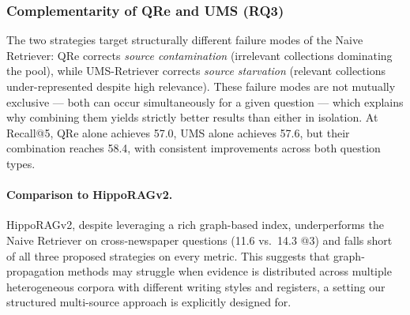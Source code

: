 \subsubsection{Complementarity of QRe and UMS (\textbf{RQ3})}
\label{sec:results-complementarity}

The two strategies target structurally different failure modes of the Naive Retriever:
QRe corrects \emph{source contamination} (irrelevant collections dominating the pool),
while UMS-Retriever corrects \emph{source starvation} (relevant collections
under-represented despite high relevance).
These failure modes are not mutually exclusive — both can occur simultaneously for
a given question — which explains why combining them yields strictly better results
than either in isolation.
At Recall@5, QRe alone achieves 57.0, UMS alone achieves 57.6, but their combination
reaches 58.4, with consistent improvements across both question types.

\paragraph{Comparison to HippoRAGv2.}
HippoRAGv2, despite leveraging a rich graph-based index, underperforms the Naive
Retriever on cross-newspaper questions (11.6 vs.\ 14.3 @3) and falls short
of all three proposed strategies on every metric.
This suggests that graph-propagation methods may struggle when evidence is distributed
across multiple heterogeneous corpora with different writing styles and registers,
a setting our structured multi-source approach is explicitly designed for.



